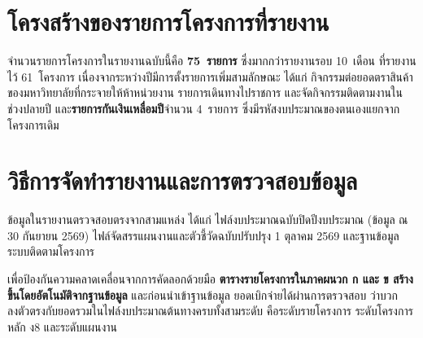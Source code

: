 \section{โครงสร้างของรายการโครงการที่รายงาน}
จำนวนรายการโครงการในรายงานฉบับนี้คือ \textbf{75~รายการ} ซึ่งมากกว่ารายงานรอบ 10~เดือน
ที่รายงานไว้ 61~โครงการ เนื่องจากระหว่างปีมีการตั้งรายการเพิ่มสามลักษณะ ได้แก่
กิจกรรมต่อยอดตราสินค้าของมหาวิทยาลัยที่กระจายให้ห้าหน่วยงาน รายการเดินทางไปราชการ
และจัดกิจกรรมติดตามงานในช่วงปลายปี และ\textbf{รายการกันเงินเหลื่อมปี}จำนวน 4~รายการ
ซึ่งมีรหัสงบประมาณของตนเองแยกจากโครงการเดิม

\section{วิธีการจัดทำรายงานและการตรวจสอบข้อมูล}
ข้อมูลในรายงานตรวจสอบตรงจากสามแหล่ง ได้แก่ ไฟล์งบประมาณฉบับปิดปีงบประมาณ (ข้อมูล ณ 30 กันยายน 2569)
ไฟล์จัดสรรแผนงานและตัวชี้วัดฉบับปรับปรุง 1 ตุลาคม 2569 และฐานข้อมูลระบบติดตามโครงการ

เพื่อป้องกันความคลาดเคลื่อนจากการคัดลอกด้วยมือ \textbf{ตารางรายโครงการในภาคผนวก ก และ ข
สร้างขึ้นโดยอัตโนมัติจากฐานข้อมูล} และก่อนนำเข้าฐานข้อมูล ยอดเบิกจ่ายได้ผ่านการตรวจสอบ
ว่าบวกลงตัวตรงกับยอดรวมในไฟล์งบประมาณต้นทางครบทั้งสามระดับ คือระดับรายโครงการ
ระดับโครงการหลัก ง8 และระดับแผนงาน
